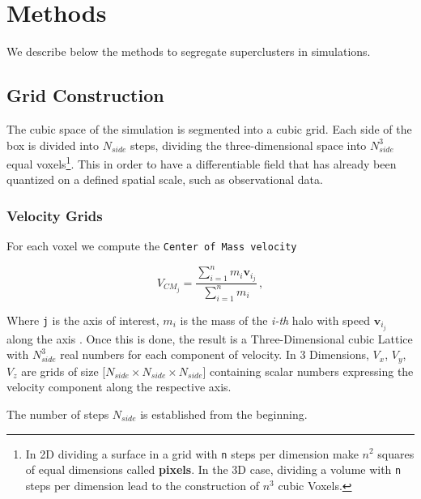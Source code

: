 \newpage
\section{Methods}

We describe below the methods to segregate superclusters in simulations.

\subsection{Grid Construction}


The cubic space of the simulation is segmented into a cubic grid. Each side of the box is divided into $N_{side}$ steps, dividing the three-dimensional space into $N_{side}^3$ equal voxels\footnote{In 2D dividing a surface in a grid with \texttt{n} steps  per dimension make $n^2$ squares of equal dimensions called \textbf{pixels}. In the 3D case, dividing a volume with \texttt{n} steps per dimension lead to the construction  of $n^3$ cubic Voxels. }. This in order to have a differentiable field that has already been quantized on a defined spatial scale, such as observational data.
 
\subsubsection{Velocity Grids}
\label{sec:INTROVgrid}
For each voxel we compute the \texttt{Center of Mass velocity}  

\begin{equation}
V_{CM_j}=\frac{\sum\limits_{i=1}^n m_i \textbf{v}_{i_j}}{\sum\limits_{i=1}^n m_i} \,,
\label{eq:CMcalc}
\end{equation}

Where \texttt{j} is the axis of interest, $m_i$ is the mass of the \textit{i-th} halo with speed $\textbf{v}_{i_j}$ along the axis . Once this is done, the result is a Three-Dimensional cubic Lattice with $N_{side}^3$ real numbers for each component of velocity. In 3 Dimensions, $V_x$, $V_y$, $V_z$ are grids of size [$N_{side} \times N_{side} \times N_{side}$] containing scalar numbers expressing the velocity component along the respective axis.

The number of steps $N_{side}$ is established from the beginning.

